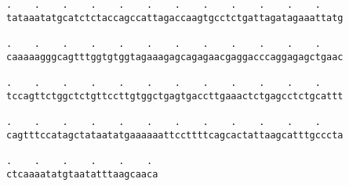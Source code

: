 \documentclass{article}
\begin{document}
\begin{Verbatim}
.    .    .    .    .    .    .    .    .    .    .    .    
tataaatatgcatctctaccagccattagaccaagtgcctctgattagatagaaattatg
                                                            
.    .    .    .    .    .    .    .    .    .    .    .    
caaaaagggcagtttggtgtggtagaaagagcagagaacgaggacccaggagagctgaac
                                                            
.    .    .    .    .    .    .    .    .    .    .    .    
tccagttctggctctgttccttgtggctgagtgaccttgaaactctgagcctctgcattt
                                                            
.    .    .    .    .    .    .    .    .    .    .    .    
cagtttccatagctataatatgaaaaaattccttttcagcactattaagcatttgcccta
                                                            
.    .    .    .    .    . 
ctcaaaatatgtaatatttaagcaaca
                           
                           
\end{Verbatim}
\end{document}
